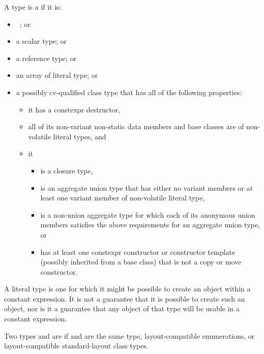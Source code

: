 \pnum
\label{term.literal.type}%
A type is a  if it is:
\begin{itemize}
\item \cv{}~; or
\item a scalar type; or
\item a reference type; or
\item an array of literal type; or
\item a possibly cv-qualified class type that
has all of the following properties:
\begin{itemize}
\item it has a constexpr destructor,
\item all of its non-variant non-static data members and base classes are of non-volatile literal types, and
\item it
\begin{itemize}
\item is a closure type,
\item is an aggregate union type that has either
no variant members or
at least one variant member of non-volatile literal type,
\item is a non-union aggregate type for which
each of its anonymous union members
satisfies the above requirements for an aggregate union type, or
\item has at least one constexpr constructor or constructor template
(possibly inherited from a base class)
that is not a copy or move constructor.
\end{itemize}
\end{itemize}
\end{itemize}
\begin{note}
A literal type is one for which
it might be possible to create an object
within a constant expression.
It is not a guarantee that it is possible to create such an object,
nor is it a guarantee that any object of that type
will be usable in a constant expression.
\end{note}

\pnum
\label{term.layout.compatible.type}%
Two types   and   are
if  and  are the same type,
layout-compatible enumerations, or
layout-compatible standard-layout class types.

